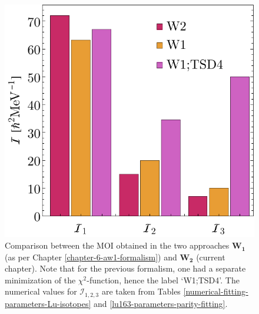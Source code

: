 \begin{figure}
    \centering
    \includegraphics[scale=0.75]{Chapters/Figures/parity-partners-plots/W1-W2-Mois.pdf}
    \caption{Comparison between the MOI obtained in the two approaches $\mathbf{W_1}$ (as per Chapter \ref{chapter-6-aw1-formalism}) and $\mathbf{W_2}$ (current chapter). Note that for the previous formalism, one had a separate minimization of the $\chi^2$-function, hence the label `W1;TSD4'. The numerical values for $\mathcal{I}_{1,2,3}$ are taken from Tables \ref{numerical-fitting-parameters-Lu-isotopes} and \ref{lu163-parameters-parity-fitting}.}
    \label{moi-comparison-w1-w2-formalisms}
\end{figure}

